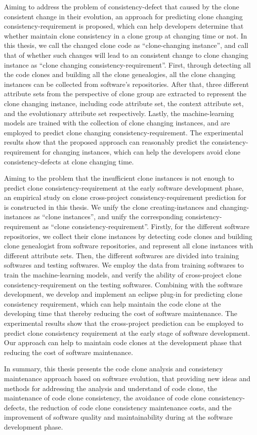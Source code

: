 {Aiming to address the problem of consistency-defect that caused by the clone consistent change in their evolution, an approach for predicting clone changing consistency-requirement is proposed, which can help developers determine that whether maintain clone consistency in a clone group at changing time or not. 
In this thesis, we call the changed clone code as ``clone-changing instance'', and call that of whether such changes will lead to an consistent change to clone changing instance as ``clone changing consistency-requirement''.
First, through detecting all the code clones and building all the clone genealogies, all the clone changing instances can be collected  from software's repositories.
After that, three different attribute sets from the perspective of clone group are extracted to represent the clone changing instance, including code attribute set, the context attribute set, and the evolutionary attribute set respectively.
Lastly, the machine-learning models are trained with the collection of clone changing instances, and are employed to predict clone changing consistency-requirement.
The experimental results show that the proposed approach can reasonably predict the consistency-requirement for changing instances, which can help the developers avoid clone consistency-defects at clone changing time.

Aiming to the problem that the insufficient clone instances is not enough to predict clone consistency-requirement at the early software development phase, an empirical study on clone cross-project consistency-requirement prediction for  is constructed in this thesis.
We unify the clone creating-instances and changing-instances as ``clone instances'', and unify the corresponding consistency-requirement as ``clone consistency-requirement''.
Firstly, for the different software repositories, we collect their clone instances by detecting code clones and building clone genealogist from software repositories, and represent all clone instances with different attribute sets.
Then, the different softwares are divided into training softwares and testing softwares.
We employ the data from training softwares to train the machine-learning models, and verify the ability of cross-project clone consistency-requirement on the testing softwares.
Combining with the software development, we develop and implement an eclipse plug-in for predicting clone consistency requirement, which can help maintain the code clone at the developing time that thereby reducing the cost of software maintenance.
The experimental results show that the cross-project prediction can be employed to predict clone consistency requirement at the early stage of software development.
Our approach can help to maintain code clones at the development phase that reducing the cost of software maintenance.

In summary, this thesis presents the code clone analysis and consistency maintenance approach based on software evolution, that providing new ideas and methods for addressing the analysis and understand of code clone, the maintenance of code clone consistency, the avoidance of code clone consistency-defects, the reduction of code clone consistency maintenance costs, and the improvement of software quality and maintainability during at the software development phase.
}

\makecover
\clearpage 
